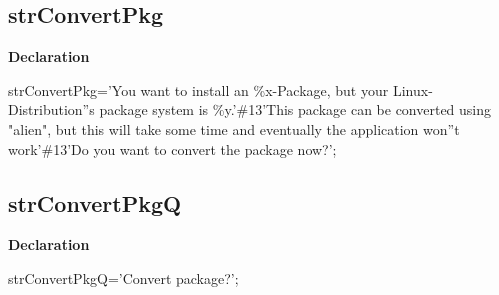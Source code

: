 \documentclass{report}
\newif\ifpdf
\begin{document}
\subsection*{strConvertPkg}
\fi
\label{trstrings-strConvertPkg}
\begin{list}{}{
\setlength{\itemindent}{0cm}
\setlength{\listparindent}{0cm}
\setlength{\leftmargin}{\evensidemargin}
\addtolength{\leftmargin}{\tmplength}
\settowidth{\labelsep}{X}
\addtolength{\leftmargin}{\labelsep}
\setlength{\labelwidth}{\tmplength}
}
\item[\textbf{Declaration}\hfill]
\ifpdf
\begin{flushleft}
\fi
\begin{ttfamily}
strConvertPkg='You want to install an {\%}x-Package, but your Linux-Distribution''s package system is {\%}y.'{\#}13'This package can be converted using "alien", but this will take some time and eventually the application won''t work'{\#}13'Do you want to convert the package now?';\end{ttfamily}

\ifpdf
\end{flushleft}
\fi

\end{list}
\ifpdf
\subsection*{\large{\textbf{strConvertPkgQ}}\normalsize\hspace{1ex}\hrulefill}
\else
\subsection*{strConvertPkgQ}
\fi
\label{trstrings-strConvertPkgQ}
\begin{list}{}{
\setlength{\itemindent}{0cm}
\setlength{\listparindent}{0cm}
\setlength{\leftmargin}{\evensidemargin}
\addtolength{\leftmargin}{\tmplength}
\settowidth{\labelsep}{X}
\addtolength{\leftmargin}{\labelsep}
\setlength{\labelwidth}{\tmplength}
}
\item[\textbf{Declaration}\hfill]
\ifpdf
\begin{flushleft}
\fi
\begin{ttfamily}
strConvertPkgQ='Convert package?';\end{ttfamily}

\ifpdf
\end{flushleft}
\fi

\end{list}
\ifpdf
\end{document}
